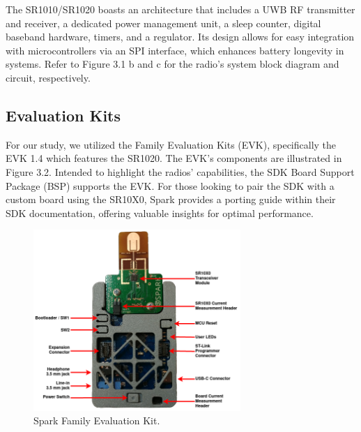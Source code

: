 The SR1010/SR1020 boasts an architecture that includes a UWB RF transmitter and receiver, a dedicated power management unit, a sleep counter, digital baseband hardware, timers, and a regulator. Its design allows for easy integration with microcontrollers via an SPI interface, which enhances battery longevity in systems. Refer to Figure 3.1 b and c for the radio's system block diagram and circuit, respectively.
	
\subsection{Evaluation Kits}		
For our study, we utilized the Family Evaluation Kits (EVK), specifically the EVK 1.4 which features the SR1020. The EVK's components are illustrated in Figure 3.2. Intended to highlight the radios' capabilities, the SDK Board Support Package (BSP) supports the EVK. For those looking to pair the SDK with a custom board using the SR10X0, Spark provides a porting guide within their SDK documentation, offering valuable insights for optimal performance.


\begin{figure}[h]
\centering
\includegraphics[width=0.7\textwidth]{images/evk picture.png}
\caption{Spark Family Evaluation Kit.}
\label{fig:spark_evk}
\end{figure}

